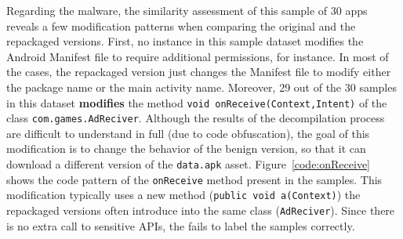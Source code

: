 Regarding the \gps malware, the similarity assessment of this sample of 30 apps reveals a few modification patterns when comparing the original and the repackaged versions. First, no instance in this \gps sample dataset modifies the Android Manifest file to require additional permissions, for instance. In most of the cases, the repackaged version just changes the Manifest file to modify either the package name or the main activity name. Moreover, 29 out of the 30 samples in this dataset  {\bf modifies} the 
method \texttt{void onReceive(Context,Intent)} of the class \texttt{com.games.AdReciver}. Although the results of the decompilation process are difficult to understand in full (due to code obfuscation), the goal of this modification is to change the behavior of the benign version, so that it can download a different version of the \texttt{data.apk} 
asset. Figure~\ref{code:onReceive} shows the code pattern of the \texttt{onReceive} method present in the samples. This modification typically uses a new method (\texttt{public void a(Context)}) the repackaged versions often introduce into the same class (\texttt{AdReciver}). Since there is no extra call to sensitive APIs, the \mas fails to label the \gps samples correctly. 


